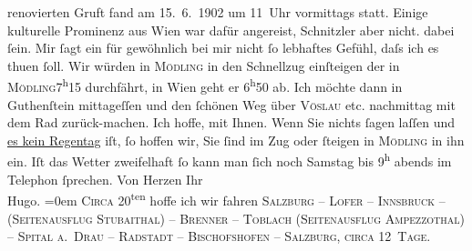 \begin{ledgroupsized}[t]{13cm}
{{{                  renovierten Gruft fand am 15. 6. 1902 um
                     11 Uhr vormittags statt. Einige kulturelle Prominenz aus Wien war dafür angereist, Schnitzler aber nicht.}}}\label{K_L01222_2h} dabei ſein. Mir ſagt ein für
               gewöhnlich bei {\pb}mir nicht ſo
               lebhaftes Gefühl, daſs ich es thuen ſoll.\pend
           \pstart
           Wir würden in \textsc{Mödling} in den Schnellzug einſteigen
               der in \textsc{Mödling}7\textsuperscript{h}15 durchfährt, in Wien geht er 6\textsuperscript{h}50 ab.
               Ich möchte dann in Guthenſtein mittageſſen {\pb}und den ſchönen Weg über \textsc{Vöslau} etc. nachmittag mit dem Rad zurück-machen. Ich hoffe, mit Ihnen.\pend
           \pstart
           Wenn Sie nichts ſagen laſſen und \uline{es kein Regentag}
               iſt, ſo hoffen wir, Sie ſind im Zug oder ſteigen in \textsc{Mödling} in ihn ein.\pend
           \pstart
           {\pb}Iſt das Wetter zweifelhaft ſo
               kann man ſich noch Samstag bis 9\textsuperscript{h} abends im Telephon ſprechen.\pend
           \pstart
           Von Herzen Ihr{\\[\baselineskip]}\spacefill\mbox{Hugo.}\pend
           \leftskip=0em{}\pstart
           \noindent{}\textsc{Circa} 20\textsuperscript{ten} hoffe ich wir
                  fahren \textsc{Salzburg – Lofer – Innsbruck – (Seitenausflug
                        Stubaithal) – Brenner – Toblach (Seitenausflug Ampezzothal) – Spital a. Drau – Radstadt – Bischofshofen – Salzburg, circa 12 Tage}.\pend
           \endnumbering{}\end{ledgroupsized}  \newcommand{\dateiname}{L01222}\newcommand{\titel}{Hugo von Hofmannsthal an Arthur Schnitzler, 1[1?]. 6. 1902}\newcommand{\editorInnen}{Martin Anton Müller und Gerd-Hermann Susen}
      